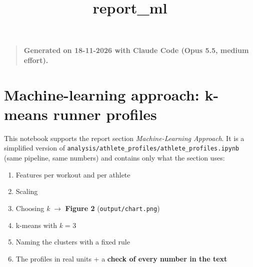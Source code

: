 \documentclass[11pt]{article}
\title{report\_ml}
\providecommand{\tightlist}{%
      \setlength{\itemsep}{0pt}\setlength{\parskip}{0pt}}
\begin{document}
    
    \maketitle
    
    

    
    \begin{quote}
\textbf{Generated on 18-11-2026 with Claude Code (Opus 5.5, medium
effort).}
\end{quote}

\section{Machine-learning approach: k-means runner
profiles}\label{machine-learning-approach-k-means-runner-profiles}

This notebook supports the report section \emph{Machine-Learning
Approach}. It is a simplified version of
\texttt{analysis/athlete\_profiles/athlete\_profiles.ipynb} (same
pipeline, same numbers) and contains only what the section uses:

\begin{enumerate}
\def\labelenumi{\arabic{enumi}.}
\tightlist
\item
  Features per workout and per athlete
\item
  Scaling
\item
  Choosing \emph{k} \ensuremath{\rightarrow} \textbf{Figure 2} (\texttt{output/chart.png})
\item
  k-means with \emph{k} = 3
\item
  Naming the clusters with a fixed rule
\item
  The profiles in real units + a \textbf{check of every number in the
  text}
\end{enumerate}
\end{document}
